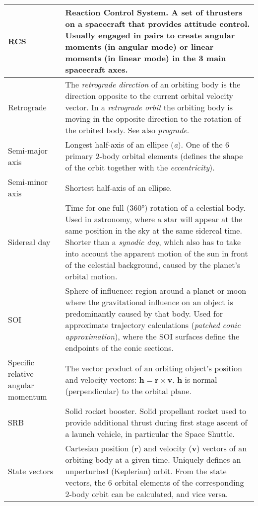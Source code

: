 \documentclass[Orbiter User Manual.tex]{subfiles}
\begin{document}
\begin{longtable}{ |p{}|p{}| }
	\hline\rule{0pt}{2ex}
	RCS & Reaction Control System. A set of thrusters on a spacecraft that provides attitude control. Usually engaged in pairs to create angular moments (in angular mode) or linear moments (in linear mode) in the 3 main spacecraft axes.\\
	\hline\rule{0pt}{2ex}
	Retrograde & The \textit{retrograde direction} of an orbiting body is the direction opposite to the current orbital velocity vector. In a \textit{retrograde orbit} the orbiting body is moving in the opposite direction to the rotation of the orbited body. See also \textit{prograde}.\\
	\hline\rule{0pt}{2ex}
	Semi-major axis & Longest half-axis of an ellipse (\textit{a}). One of the 6 primary 2-body orbital elements (defines the shape of the orbit together with the \textit{eccentricity}).\\
	\hline\rule{0pt}{2ex}
	Semi-minor axis & Shortest half-axis of an ellipse.\\
	\hline\rule{0pt}{2ex}
	Sidereal day & Time for one full (360°) rotation of a celestial body. Used in astronomy, where a star will appear at the same position in the sky at the same sidereal time. Shorter than a \textit{synodic day}, which also has to take into account the apparent motion of the sun in front of the celestial background, caused by the planet's orbital motion.\\
	\hline\rule{0pt}{2ex}
	SOI & Sphere of influence: region around a planet or moon where the gravitational influence on an object is predominantly caused by that body. Used for approximate trajectory calculations (\textit{patched conic approximation}), where the SOI surfaces define the endpoints of the conic sections.\\
	\hline\rule{0pt}{2ex}
	Specific relative angular momentum & The vector product of an orbiting object's position and velocity vectors: $\textbf{h} = \textbf{r} \times \textbf{v}$. \textbf{h} is normal (perpendicular) to the orbital plane.\\
	\hline\rule{0pt}{2ex}
	SRB & Solid rocket booster. Solid propellant rocket used to provide additional thrust during first stage ascent of a launch vehicle, in particular the Space Shuttle.\\
	\hline\rule{0pt}{2ex}
	State vectors & Cartesian position (\textbf{r}) and velocity (\textbf{v}) vectors of an orbiting body at a given time. Uniquely defines an unperturbed (Keplerian) orbit. From the state vectors, the 6 orbital elements of the corresponding 2-body orbit can be calculated, and vice versa.\\

\end{longtable}
\end{document}
